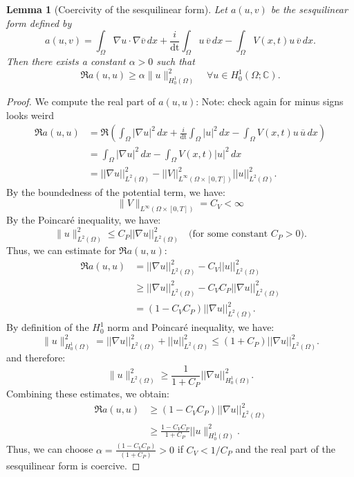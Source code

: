\documentclass{article}
\theoremstyle{definition}
\theoremstyle{plain}
\newtheorem{lemma}[definition]{Lemma}
\theoremstyle{remark}
\newcommand{\dt}{\text{dt}}
\begin{document}
\begin{lemma}
[Coercivity of the sesquilinear form]
Let \( a(u, v) \) be the sesquilinear form defined by
\[
a(u, v) = \int_\Omega \nabla u \cdot \nabla \overline{v} \, dx + \frac{i}{\dt} \int_\Omega  u \, \overline{v} \, dx - \int_\Omega V(x,t) u \, \overline{v} \, dx.
\]
Then there exists a constant \( \alpha > 0 \) such that
\[
\Re a(u, u) \geq \alpha \|u\|_{H_0^1(\Omega)}^2 \quad \forall u \in H_0^1(\Omega; \mathbb{C}).
\]
\end{lemma}
\begin{proof}
We compute the real part of $a(u,u)$:
Note: check again for minus signs looks weird
\begin{align*}
\Re a(u, u)
&= \Re \left( \int_\Omega |\nabla u|^2 \, dx + \frac{i}{\dt}\int_\Omega   |u|^2 \, dx - \int_\Omega V(x,t) u \, \overline{u} \, dx \right) \\
&=  \int_\Omega |\nabla u|^2 \, dx - \int_\Omega V(x,t) |u|^2 \, dx \\
&= ||\nabla u||_{L^2(\Omega)}^2 - ||V||_{L^\infty(\Omega \times [0,T])}^2 ||u||_{L^2(\Omega)}^2.
\end{align*}
By the boundedness of the potential term, we have:
\[ \|V\|_{L^\infty(\Omega \times [0,T])} = C_V < \infty\]
By the Poincaré inequality, we have:
\[
\|u\|_{L^2(\Omega)}^2 \leq C_P ||\nabla u||_{L^2(\Omega)}^2 \quad \text{(for some constant } C_P > 0\text{)}.
\]
Thus, we can estimate for $\Re a(u, u)$:
\begin{align*}
\Re a(u, u) &= ||\nabla u||_{L^2(\Omega)}^2 - C_V ||u||_{L^2(\Omega)}^2 \\
&\geq ||\nabla u||_{L^2(\Omega)}^2 - C_V C_P ||\nabla u||_{L^2(\Omega)}^2 \\
&= (1 - C_V C_P) ||\nabla u||_{L^2(\Omega)}^2.
\end{align*}
By definition of the \(H_0^1\) norm and Poincaré inequality, we have:
\[\|u\|_{H_0^1(\Omega)}^2 = ||\nabla u||_{L^2(\Omega)}^2 + ||u||_{L^2(\Omega)}^2 \leq (1+C_P) ||\nabla u||_{L^2(\Omega)}^2.\]
and therefore:
\[\|u\|_{L^2(\Omega)}^2 \geq \frac{1}{1 + C_P} ||\nabla u||_{H_0^1(\Omega)}^2.\]
Combining these estimates, we obtain:
\begin{align*}
\Re a(u, u) &\geq (1 - C_V C_P) ||\nabla u||_{L^2(\Omega)}^2 \\
&\geq  \frac{1 - C_V C_P}{1 + C_P} ||u\|_{H_0^1(\Omega)}^2.
\end{align*}
Thus, we can choose \( \alpha = \frac{(1 - C_V C_P)}{(1 + C_P)} > 0 \) if \( C_V < 1/C_P \) and the real part of the sesquilinear form is coercive.


\end{proof}
\end{document}
